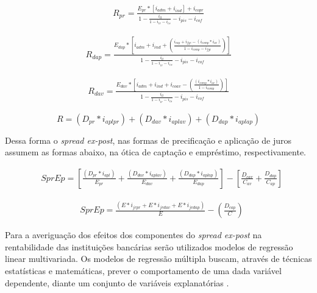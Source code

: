 \documentclass[
  12pt,
  12pt,
  openright,
  oneside,
  a4paper,
  chapter=TITLE,
  section=TITLE,
  subsection=TITLE,
  subsubsection=TITLE,
  english,
  portugues,
  sumario=tradicional]{abntex2}
\begin{document}
\begin{equation}
\begin{aligned}
R_{pr} = \frac{E_{pr} * [i_{adm} + i_{ind}] + i_{copr}}
{1 -  \frac{i_{ll}}{1 - i_{ir} - i_{cs}} - i_{pis} - i_{cof}}
\end{aligned}
\end{equation}

\begin{equation}
\begin{aligned}
R_{dap} = \frac{E_{dap} * [i_{adm} + i_{ind} + (\frac{i_{cap}+ i_{fgc} - (i_{comp}*i_{ac})}{1 - i_{comp} - i_{fgc}})]}  {1 -  \frac{i_{ll}}{1 - i_{ir} - i_{cs}} - i_{pis} - i_{cof}}
\end{aligned}
\end{equation}

\begin{equation}
\begin{aligned}
R_{dav} = \frac{E_{dav} * [i_{adm} + i_{ind} + i_{coav} - (\frac{(i_{comp}*i_{ac})}{1 - i_{comp}})]}{1 -  \frac{i_{ll}}{1 - i_{ir} - i_{cs}} - i_{pis} - i_{cof}}
\end{aligned}
\end{equation}

\begin{equation}
R = (D_{pr}*i_{aplpr}) + (D_{dav} * i_{aplav}) +( D_{dap}* i_{aplap})
\end{equation}

Dessa forma o \emph{spread ex-post}, nas formas de precificação e aplicação de juros assumem as formas abaixo, na ótica de captação e empréstimo, respectivamente.

\begin{equation}
\begin{aligned}
& SprEp = [\frac{(D_{pr}* i_{apl})}{E_{pr}} + \frac{(D_{dav}* i_{aplav})}{E_{dav}} + \frac{(D_{dap}* i_{aplap})}{E_{dap}}] - [ \frac{D_{cav}}{C_{av}} + \frac{D_{dap}}{C_{ap}} ]
\end{aligned}
\end{equation}

\begin{equation}
\begin{aligned}
& SprEp = \frac{(E*i_{jrpr} + E*i_{jrdav} + E*i_{jrdap})}{E} - (\frac{D_{cap}}{C})
\end{aligned}
\end{equation}

Para a averiguação dos efeitos dos componentes do \emph{spread ex-post} na rentabilidade das instituições bancárias serão utilizados modelos de regressão linear multivariada. Os modelos de regressão múltipla buscam, através de técnicas estatísticas e matemáticas, prever o comportamento de uma dada variável dependente, diante um conjunto de variáveis explanatórias \cite{hill:2010} \cite{gareth:2017}.
\end{document}
